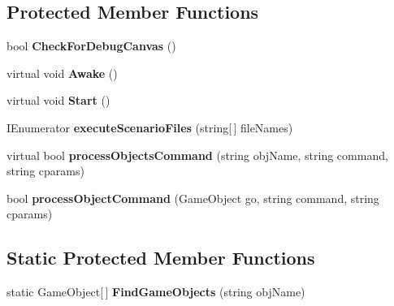 \subsection*{Protected Member Functions}
\begin{DoxyCompactItemize}
\item 
bool {\bfseries Check\+For\+Debug\+Canvas} ()\hypertarget{class_my_game_manager_a3ab7dc87d27a49fd03915595bfbff78f}{}\label{class_my_game_manager_a3ab7dc87d27a49fd03915595bfbff78f}

\item 
virtual void {\bfseries Awake} ()\hypertarget{class_my_game_manager_aebdf9e84f8caa0a46546606f16964730}{}\label{class_my_game_manager_aebdf9e84f8caa0a46546606f16964730}

\item 
virtual void {\bfseries Start} ()\hypertarget{class_my_game_manager_aa811ca355f7f75162b47bbdebce78f8f}{}\label{class_my_game_manager_aa811ca355f7f75162b47bbdebce78f8f}

\item 
I\+Enumerator {\bfseries execute\+Scenario\+Files} (string\mbox{[}$\,$\mbox{]} file\+Names)\hypertarget{class_my_game_manager_a68337283e609631acc429190ffecbe1e}{}\label{class_my_game_manager_a68337283e609631acc429190ffecbe1e}

\item 
virtual bool {\bfseries process\+Objects\+Command} (string obj\+Name, string command, string cparams)\hypertarget{class_my_game_manager_a006dea9fc9334d45598f8e4342430a01}{}\label{class_my_game_manager_a006dea9fc9334d45598f8e4342430a01}

\item 
bool {\bfseries process\+Object\+Command} (Game\+Object go, string command, string cparams)\hypertarget{class_my_game_manager_aec71d04e9e5b698c53140b102943a945}{}\label{class_my_game_manager_aec71d04e9e5b698c53140b102943a945}

\end{DoxyCompactItemize}
\subsection*{Static Protected Member Functions}
\begin{DoxyCompactItemize}
\item 
static Game\+Object\mbox{[}$\,$\mbox{]} {\bfseries Find\+Game\+Objects} (string obj\+Name)\hypertarget{class_my_game_manager_a8c7effa1a4adcf82ebb91c3af95102c9}{}\label{class_my_game_manager_a8c7effa1a4adcf82ebb91c3af95102c9}

\end{DoxyCompactItemize}
